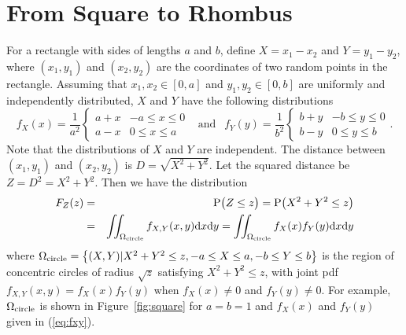 \documentclass[12pt,draftclsnofoot,onecolumn]{IEEEtran}
\begin{document}
\section{From Square to Rhombus}
For a rectangle with sides of lengths $a$ and $b$, define $X=x_1-x_2$ and
$Y=y_1-y_2$, where $(x_1, y_1)$ and $(x_2, y_2)$ are the coordinates of two
random points in the rectangle.
Assuming that $x_1, x_2 \in [0,a]$ and $y_1, y_2 \in [0, b]$ are uniformly and independently distributed,
$X$ and $Y$ have the following distributions
\begin{equation}\label{eq:fxy}
  f_X(x)=\frac{1}{a^2}\left\{
    \begin{array}{lr}
      a+x & -a\leq x \leq 0 \\
      a-x & 0 \leq x \leq a
    \end{array}
  \right.
  ~~\mbox{ and }~~ f_Y(y)=\frac{1}{b^2}\left\{
    \begin{array}{lr}
      b+y & -b\leq y \leq 0 \\
      b-y & 0 \leq y \leq b
    \end{array}
  \right..
\end{equation}
%
Note that the distributions of $X$ and $Y$ are independent.
The distance between $(x_1, y_1)$ and $(x_2, y_2)$ is $D=\sqrt{X^2+Y^2}$.
Let the squared distance be $Z=D^2=X^2+Y^2$.
Then we have the distribution
\begin{eqnarray}\label{eq-rec}
F_Z(z)&=& {\rm P}\big(Z \leq z \big) = {\rm P}\big(X^2+Y^2 \leq z \big)\nonumber\\
&=&\iint_{\Omega_{\rm circle}}f_{X,Y}(x,y){\rm d}x{\rm d}y=
\iint_{\Omega_{\rm circle}}f_X(x)f_Y(y){\rm d}x{\rm d}y
\end{eqnarray}
where $\Omega_{\rm circle}=\left\{(X,Y)|X^2+Y^2\leq z, -a \leq X \leq a, -b \leq Y \leq b\right\}$
is the region of concentric circles of radius $\sqrt{z}$ satisfying $X^2+Y^2\leq z$, 
with joint pdf $f_{X, Y}(x, y)=f_X(x)f_Y(y)$ when $f_X(x)\neq 0$ and $f_Y(y)\neq 0$.
For example, $\Omega_{\rm circle}$ is shown in Figure~\ref{fig:square} for
$a=b=1$ and $f_X(x)$ and $f_Y(y)$ given in (\ref{eq:fxy}).
\end{document}
